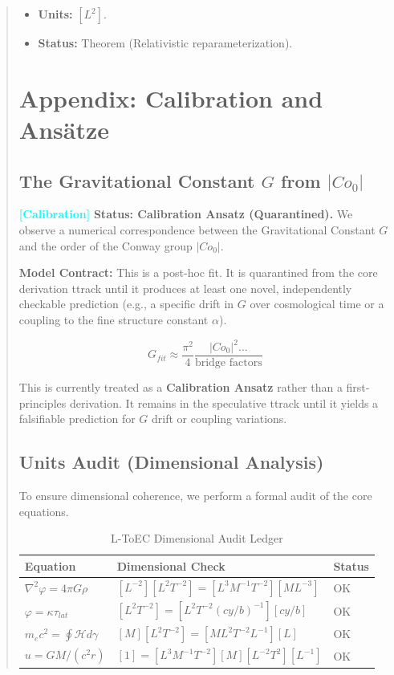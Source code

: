 \documentclass[11pt,titlepage]{article}
\newcommand{\tagcal}{\textcolor{cyan}{\textbf{[Calibration]}} }
\begin{document}
\begin{abstract}
\begin{itemize}
\begin{itemize}
\item \textbf{Units:} $[L^2]$.
            
\item \textbf{Status:} Theorem (Relativistic reparameterization).
        \end{itemize}
\end{itemize}

\section{Appendix: Calibration and Ansätze}
\label{sec:calibration}

\subsection{The Gravitational Constant $G$ from $|Co_0|$}
\tagcal \textbf{Status: Calibration Ansatz (Quarantined).} 
We observe a numerical correspondence between the Gravitational Constant $G$ and the order of the Conway group $|Co_0|$. 

\textbf{Model Contract:} This is a post-hoc fit. It is quarantined from the core derivation ttrack until it produces at least one novel, independently checkable prediction (e.g., a specific drift in $G$ over cosmological time or a coupling to the fine structure constant $\alpha$).

\begin{equation}
G_{fit} \approx \frac{\pi^2}{4} \frac{|Co_0|^2 \dots}{\text{bridge factors}}
\end{equation}

This is currently treated as a \textbf{Calibration Ansatz} rather than a first-principles derivation. It remains in the speculative ttrack until it yields a falsifiable prediction for $G$ drift or coupling variations.

\subsection{Units Audit (Dimensional Analysis)}
\label{sec:units_audit}
To ensure dimensional coherence, we perform a formal audit of the core equations.

\begin{table}[h!]
\centering
\begin{tabular}{@{}lll@{}}
\toprule
\textbf{Equation} & \textbf{Dimensional Check} & \textbf{Status} \\ \midrule
$\nabla^2 \varphi = 4\pi G \rho$ & $[L^{-2}][L^2 T^{-2}] = [L^3 M^{-1} T^{-2}][M L^{-3}]$ & OK \\
$\varphi = \kappa \tau_{lat}$ & $[L^2 T^{-2}] = [L^2 T^{-2} (cy/b)^{-1}][cy/b]$ & OK \\
$m_e c^2 = \oint \mathcal{H} d\gamma$ & $[M][L^2 T^{-2}] = [M L^2 T^{-2} L^{-1}][L]$ & OK \\
$u = GM/(c^2 r)$ & $[1] = [L^3 M^{-1} T^{-2}][M][L^{-2} T^2][L^{-1}]$ & OK \\ \bottomrule
\end{tabular}
\caption{L-ToEC Dimensional Audit Ledger}
\end{table}


\end{abstract}
\end{document}
